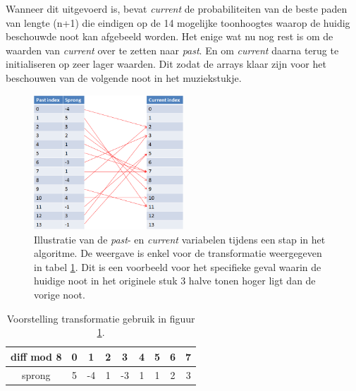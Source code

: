 Wanneer dit uitgevoerd is, bevat \textit{current} de probabiliteiten van de beste paden van lengte (n+1) die eindigen op de 14 mogelijke toonhoogtes waarop de huidig beschouwde noot kan afgebeeld worden.
Het enige wat nu nog rest is om de waarden van \textit{current} over te zetten naar \textit{past}. En om \textit{current} daarna terug te initialiseren op zeer lager waarden. Dit zodat de arrays klaar zijn voor het beschouwen van de volgende noot in het muziekstukje. 

\begin{figure}[!ht]
  \centering
  \includegraphics[width=0.5\textwidth]{4_Efficient_Toepassen_Transformatie/stap_algo_1}
  \caption{Illustratie van de \textit{past}- en \textit{current} variabelen tijdens een stap in het algoritme. De weergave is enkel voor de transformatie weergegeven in tabel \ref{tabel:transformatie}. Dit is een voorbeeld voor het specifieke geval waarin de huidige noot in het originele stuk 3 halve tonen hoger ligt dan de vorige noot.}
  \label{figuur:stap_algo_1}
\end{figure}

\begin{table}
  \centering
  \begin{tabular}{c | c  c  c  c  c  c  c  c }
    diff mod 8 & 0 & 1 & 2 & 3 & 4 & 5 & 6 & 7 \\
    \hline
    sprong & 5 & -4 & 1 & -3 & 1 & 1 & 2 & 3 \\
  \end{tabular}
  \caption{Voorstelling transformatie gebruik in figuur \ref{figuur:stap_algo_1}.}
  \label{tabel:transformatie}
\end{table}

